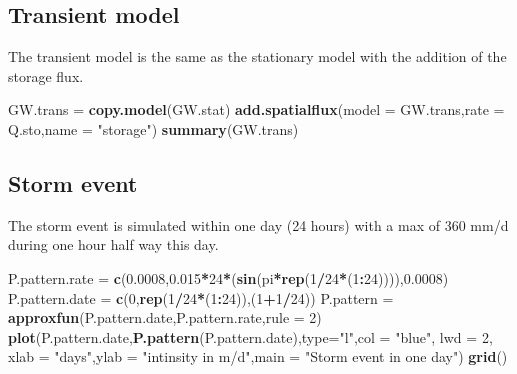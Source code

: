 \documentclass[
]{article}
\newenvironment{Shaded}{\begin{snugshade}}{\end{snugshade}}
\newcommand{\AttributeTok}[1]{\textcolor[rgb]{0.13,0.29,0.53}{#1}}
\newcommand{\DecValTok}[1]{\textcolor[rgb]{0.00,0.00,0.81}{#1}}
\newcommand{\FloatTok}[1]{\textcolor[rgb]{0.00,0.00,0.81}{#1}}
\newcommand{\FunctionTok}[1]{\textcolor[rgb]{0.13,0.29,0.53}{\textbf{#1}}}
\newcommand{\NormalTok}[1]{#1}
\newcommand{\OtherTok}[1]{\textcolor[rgb]{0.56,0.35,0.01}{#1}}
\newcommand{\SpecialCharTok}[1]{\textcolor[rgb]{0.81,0.36,0.00}{\textbf{#1}}}
\newcommand{\StringTok}[1]{\textcolor[rgb]{0.31,0.60,0.02}{#1}}
\begin{document}
\hypertarget{transient-model}{%
\subsection{Transient model}\label{transient-model}}

The transient model is the same as the stationary model with the
addition of the storage flux.

\begin{Shaded}
\begin{Highlighting}[]
\NormalTok{GW.trans }\OtherTok{=} \FunctionTok{copy.model}\NormalTok{(GW.stat)}
\FunctionTok{add.spatialflux}\NormalTok{(}\AttributeTok{model =}\NormalTok{ GW.trans,}\AttributeTok{rate =}\NormalTok{ Q.sto,}\AttributeTok{name =} \StringTok{"storage"}\NormalTok{)}
\FunctionTok{summary}\NormalTok{(GW.trans)}
\end{Highlighting}
\end{Shaded}

\hypertarget{storm-event}{%
\subsection{Storm event}\label{storm-event}}

The storm event is simulated within one day (24 hours) with a max of 360
mm/d during one hour half way this day.

\begin{Shaded}
\begin{Highlighting}[]
\NormalTok{P.pattern.rate }\OtherTok{=} \FunctionTok{c}\NormalTok{(}\FloatTok{0.0008}\NormalTok{,}\FloatTok{0.015}\SpecialCharTok{*}\DecValTok{24}\SpecialCharTok{*}\NormalTok{(}\FunctionTok{sin}\NormalTok{(pi}\SpecialCharTok{*}\FunctionTok{rep}\NormalTok{(}\DecValTok{1}\SpecialCharTok{/}\DecValTok{24}\SpecialCharTok{*}\NormalTok{(}\DecValTok{1}\SpecialCharTok{:}\DecValTok{24}\NormalTok{)))),}\FloatTok{0.0008}\NormalTok{)}
\NormalTok{P.pattern.date }\OtherTok{=} \FunctionTok{c}\NormalTok{(}\DecValTok{0}\NormalTok{,}\FunctionTok{rep}\NormalTok{(}\DecValTok{1}\SpecialCharTok{/}\DecValTok{24}\SpecialCharTok{*}\NormalTok{(}\DecValTok{1}\SpecialCharTok{:}\DecValTok{24}\NormalTok{)),(}\DecValTok{1}\SpecialCharTok{+}\DecValTok{1}\SpecialCharTok{/}\DecValTok{24}\NormalTok{))}
\NormalTok{P.pattern }\OtherTok{=} \FunctionTok{approxfun}\NormalTok{(P.pattern.date,P.pattern.rate,}\AttributeTok{rule =} \DecValTok{2}\NormalTok{)}
\FunctionTok{plot}\NormalTok{(P.pattern.date,}\FunctionTok{P.pattern}\NormalTok{(P.pattern.date),}\AttributeTok{type=}\StringTok{"l"}\NormalTok{,}\AttributeTok{col =} \StringTok{"blue"}\NormalTok{,}
     \AttributeTok{lwd =} \DecValTok{2}\NormalTok{, }\AttributeTok{xlab =} \StringTok{"days"}\NormalTok{,}\AttributeTok{ylab =} \StringTok{"intinsity in m/d"}\NormalTok{,}\AttributeTok{main =} \StringTok{"Storm event in one day"}\NormalTok{)}
\FunctionTok{grid}\NormalTok{()}
\end{Highlighting}
\end{Shaded}
\end{document}
